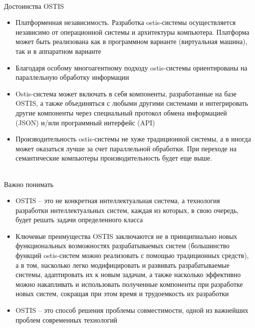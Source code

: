 \begin{frame}{\\Достоинства OSTIS}
	\vspace{10mm}
	\begin{itemize}
		\item Платформенная независимость. Разработка ostis-системы осуществляется независимо от операционной системы и архитектуры компьютера. Платформа может быть реализована как в программном варианте (виртуальная машина), так и в аппаратном варианте
		\item Благодаря особому многоагентному подходу ostis-системы ориентированы на параллельную обработку информации
		\item Ostis-система может включать в себя компоненты, разработанные на базе OSTIS, а также объединяться с любыми другими системами и интегрировать другие компоненты через специальный протокол обмена информацией (JSON) и/или программный интерфейс (API)
		\item Производительность ostis-системы не хуже традиционной системы, а в иногда может оказаться лучше за счет параллельной обработки. При переходе на семантические компьютеры производительность будет еще выше.
	\end{itemize}
\end{frame}
  
\begin{frame}{\\Важно понимать}
	\vspace{10mm}
	\begin{itemize}
		\item  OSTIS -- это не конкретная интеллектуальная система, а технология разработки интеллектуальных систем, каждая из которых, в свою очередь, будет решать задачи определенного класса
		\item Ключевые преимущества OSTIS заключаются не в принципиально новых функциональных возможностях разрабатываемых систем (большинство функций ostis-систем можно реализовать с помощью традиционных средств), а в том, насколько легко модифицировать и развивать разрабатываемые системы, адаптировать их к новым задачам, а также насколько эффективно можно накапливать и использовать полученные компоненты при разработке новых систем, сокращая при этом время и трудоемкость их разработки
		\item OSTIS -- это способ решения проблемы совместимости, одной из важнейших проблем современных технологий
	\end{itemize}
\end{frame}	

